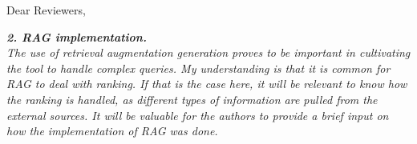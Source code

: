 \documentclass[12pt,a4paper]{letter}
\begin{document}
\begin{letter}{Dear Reviewers,}
%
%
%
%

\textit{\textbf{2. RAG implementation.}\\
The use of retrieval augmentation generation proves to be important in cultivating the tool to handle complex queries. My understanding is that it is common for RAG to deal with ranking. If that is the case here, it will be relevant to know how the ranking is handled, as different types of information are pulled from the external sources. It will be valuable for the authors to provide a brief input on how the implementation of RAG was done.}


\end{letter}
\end{document}
